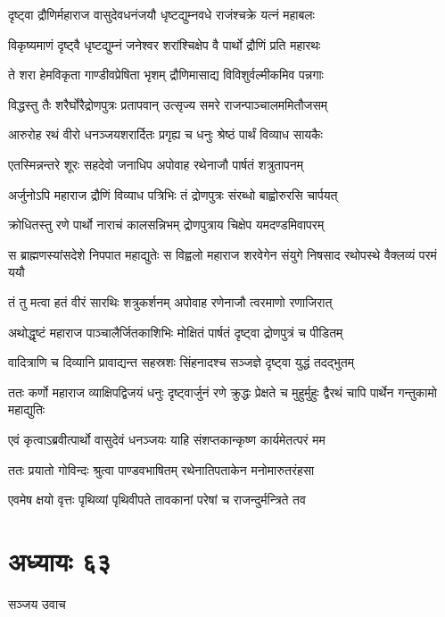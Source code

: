 \twolineshloka
{दृष्ट्वा द्रौणिर्महाराज वासुदेवधनंजयौ}
{धृष्टद्युम्नवधे राजंश्चक्रे यत्नं महाबलः}


\twolineshloka
{विकृष्यमाणं दृष्ट्वै धृष्टद्युम्नं जनेश्वर}
{शरांश्चिक्षेप वै पार्थो द्रौणिं प्रति महारथः}


\twolineshloka
{ते शरा हेमविकृता गाण्डीवप्रेषिता भृशम्}
{द्रौणिमासाद्य विविशुर्वल्मीकमिव पन्नगाः}


\twolineshloka
{विद्धस्तु तैः शरैर्घोरैद्रोणपुत्रः प्रतापवान्}
{उत्सृज्य समरे राजन्पाञ्चालममितौजसम्}


\twolineshloka
{आरुरोह रथं वीरो धनञ्जयशरार्दितः}
{प्रगृह्य च धनुः श्रेष्ठं पार्थं विव्याध सायकैः}


\twolineshloka
{एतस्मिन्नन्तरे शूरः सहदेवो जनाधिप}
{अपोवाह रथेनाजौ पार्षतं शत्रुतापनम्}


\twolineshloka
{अर्जुनोऽपि महाराज द्रौणिं विव्याध पत्रिभिः}
{तं द्रोणपुत्रः संरब्धो बाह्वोरुरसि चार्पयत्}


\twolineshloka
{क्रोधितस्तु रणे पार्थो नाराचं कालसन्निभम्}
{द्रोणपुत्राय चिक्षेप यमदण्डमिवापरम्}


\threelineshloka
{स ब्राह्मणस्यांसदेशे निपपात महाद्युतेः}
{स विह्वलो महाराज शरवेगेन संयुगे}
{निषसाद रथोपस्थे वैक्लव्यं परमं ययौ}


\twolineshloka
{तं तु मत्वा हतं वीरं सारथिः शत्रुकर्शनम्}
{अपोवाह रणेनाजौ त्वरमाणो रणाजिरात्}


\twolineshloka
{अथोद्धृष्टं महाराज पाञ्चालैर्जितकाशिभिः}
{मोक्षितं पार्षतं दृष्ट्वा द्रोणपुत्रं च पीडितम्}


\twolineshloka
{वादित्राणि च दिव्यानि प्रावाद्यन्त सहस्रशः}
{सिंहनादश्च सञ्जज्ञे दृष्ट्वा युद्धं तदद्भुतम्}


\threelineshloka
{ततः कर्णो महाराज व्याक्षिपद्विजयं धनुः}
{दृष्ट्वार्जुनं रणे क्रुद्धः प्रेक्षते च मुहुर्मुहुः}
{द्वैरथं चापि पार्थेन गन्तुकामो महाद्युतिः}


\twolineshloka
{एवं कृत्वाऽब्रवीत्पार्थो वासुदेवं धनञ्जयः}
{याहि संशप्तकान्कृष्ण कार्यमेतत्परं मम}


\twolineshloka
{ततः प्रयातो गोविन्दः श्रुत्वा पाण्डवभाषितम्}
{रथेनातिपताकेन मनोमारुतरंहसा}


\twolineshloka
{एवमेष क्षयो वृत्तः पृथिव्यां पृथिवीपते}
{तावकानां परेषां च राजन्दुर्मन्त्रिते तव}


\chapter{अध्यायः ६३}
\twolineshloka
{सञ्जय उवाच}
{}


